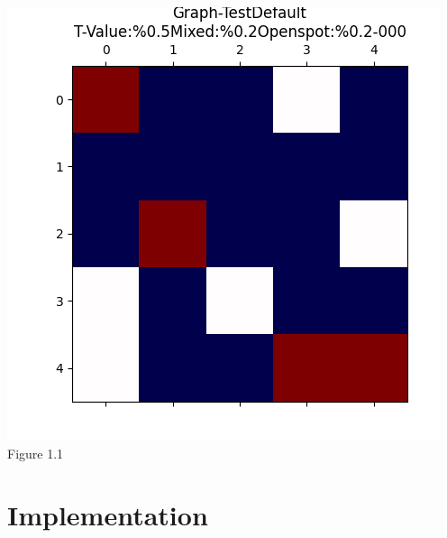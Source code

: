 \documentclass[letterpaper]{article}
\begin{document}
\begin{center}
\includegraphics[scale=0.7]{./Images/TestExample_Figure_1.1}
Figure 1.1
\end{center}

\section{Implementation}  
\end{document}
